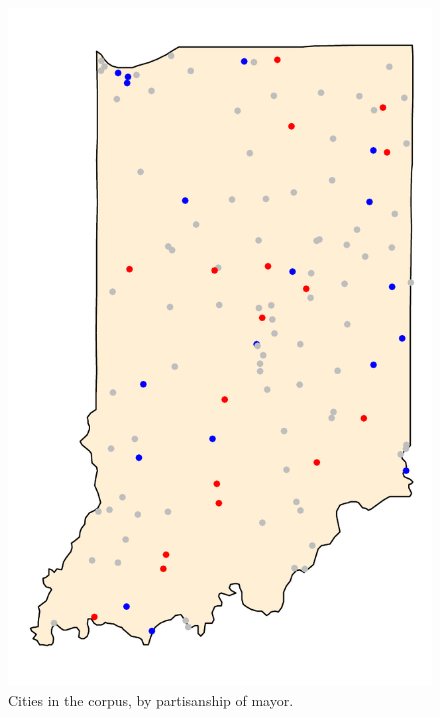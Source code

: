 \documentclass[11pt]{article}
\begin{document}
\begin{figure}[!ht]
	\centering %
	\caption{Cities in the corpus, by partisanship of mayor.}
	\label{indiana_map}
	\includegraphics[height=0.75\textheight]{figures/indiana_map.pdf}
\end{figure}
\end{document}
